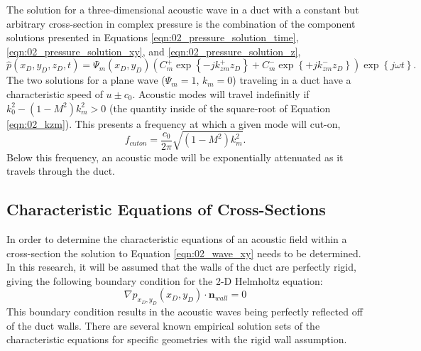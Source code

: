 The solution for a three-dimensional acoustic wave in a duct with a constant but arbitrary cross-section in complex pressure is the combination of the component solutions presented in Equations \ref{eqn:02_pressure_solution_time}, \ref{eqn:02_pressure_solution_xy}, and \ref{eqn:02_pressure_solution_z},
\begin{equation}
  \hat{p}(x_D,y_D,z_D,t) = \Psi_m(x_D,y_D)\left(C^+_m\exp{\left\{-jk^+_{zm}z_D\right\}}+C^-_m\exp{\left\{+jk^-_{zm}z_D\right\}}\right)\exp\left\{j\omega t\right\} \textrm{.}
  \label{eqn:02_pressure_solution_duct}
\end{equation}
The two solutions for a plane wave ($\Psi_m=1$, $k_m=0$) traveling in a duct have a characteristic speed of $u\pm c_0$.
Acoustic modes will travel indefinitly if $k_0^2-(1-M^2)k_m^2>0$ (the quantity inside of the square-root of Equation \ref{eqn:02_kzm}).
This presents a frequency at which a given mode will cut-on,
\begin{equation}
  f_{cuton} = \frac{c_0}{2\pi}\sqrt{(1-M^2)k_m^2} \textrm{.}
  \label{eqn:02_cuton_freq}
\end{equation}
Below this frequency, an acoustic mode will be exponentially attenuated as it travels through the duct.

\subsection{Characteristic Equations of Cross-Sections}
In order to determine the characteristic equations of an acoustic field within a cross-section the solution to Equation \ref{eqn:02_wave_xy} needs to be determined.
In this research, it will be assumed that the walls of the duct are perfectly rigid, giving the following boundary condition for the 2-D Helmholtz equation:
\begin{equation}
  \nabla p_{x_D,y_D}(x_D,y_D)\cdot\mathbf{n}_{wall} = 0
  \label{eqn:02_bc_rigig_wall}
\end{equation}
This boundary condition results in the acoustic waves being perfectly reflected off of the duct walls.
There are several known empirical solution sets of the characteristic equations for specific geometries with the rigid wall assumption.


